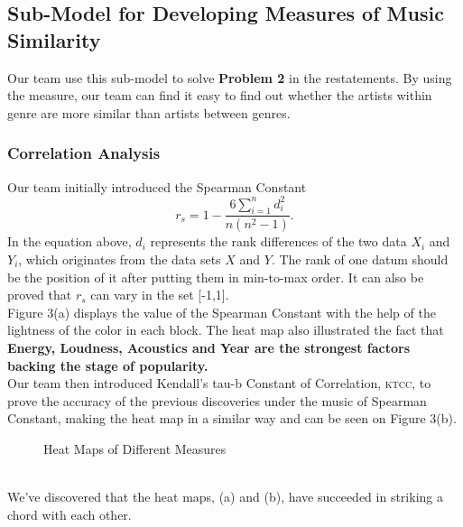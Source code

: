 \documentclass[12pt]{article}
\begin{document}
{\subsection{Sub-Model for Developing Measures of Music Similarity}
Our team use this sub-model to solve \textbf{Problem 2} in the restatements. By using the measure, our team can find it easy to find out whether the artists within genre are more similar than artists between genres.
\subsubsection{Correlation Analysis}
Our team initially introduced the Spearman Constant
\begin{equation}
	r_s=1-\frac{6\sum\limits_{i=1}^nd_i^2}{n(n^2-1)}.
\end{equation}
In the equation above, $d_i$ represents the rank differences of the two data $X_i$ and $Y_i$, which originates from the data sets $X$ and $Y$. The rank of one datum should be the position of it after putting them in min-to-max order. It can also be proved that $r_s$ can vary in the set [-1,1].\\[2ex]
Figure 3(a) displays the value of the Spearman Constant with the help of the lightness of the color in each block.
The heat map also illustrated the fact that {\textbf{Energy, Loudness, Acoustics and Year are the strongest factors backing the stage of popularity.}}\\[1ex]
Our team then introduced Kendall's tau-b Constant of Correlation, {\textsc{ktcc}}, to prove the accuracy of the previous discoveries under the music of Spearman Constant, making the heat map in a similar way and can be seen on Figure 3(b).\\
\begin{figure}[htbp]
	\centering
	\hspace{0.5cm}
	\caption{Heat Maps of Different Measures}
\end{figure}
\\We've discovered that the heat maps, (a) and (b), have succeeded in striking a chord with each other.
}
\end{document}
